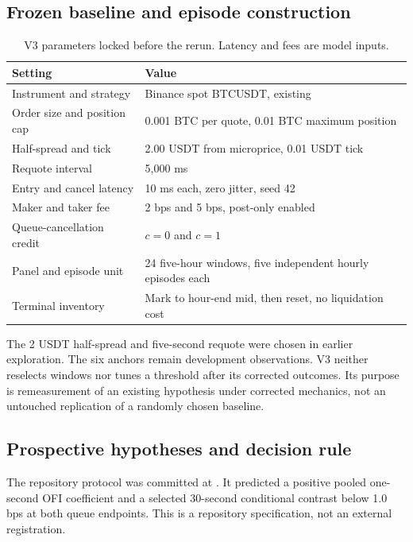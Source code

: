 \subsection{Frozen baseline and episode construction}

\begin{table}[H]
\centering
\caption{V3 parameters locked before the rerun. Latency and fees are model inputs.}
\begin{tabularx}{\textwidth}{@{}L{0.40\textwidth}Y@{}}
\toprule
Setting & Value \\
\midrule
Instrument and strategy & Binance spot BTCUSDT, existing  \\
Order size and position cap & 0.001 BTC per quote, 0.01 BTC maximum position \\
Half-spread and tick & 2.00 USDT from microprice, 0.01 USDT tick \\
Requote interval & 5,000 ms \\
Entry and cancel latency & 10 ms each, zero jitter, seed 42 \\
Maker and taker fee & 2 bps and 5 bps, post-only enabled \\
Queue-cancellation credit & $c=0$ and $c=1$ \\
Panel and episode unit & 24 five-hour windows, five independent hourly episodes each \\
Terminal inventory & Mark to hour-end mid, then reset, no liquidation cost \\
\bottomrule
\end{tabularx}
\end{table}

The 2 USDT half-spread and five-second requote were chosen in earlier
exploration. The six anchors remain development observations. V3 neither
reselects windows nor tunes a threshold after its corrected outcomes. Its
purpose is remeasurement of an existing hypothesis under corrected mechanics,
not an untouched replication of a randomly chosen baseline.

\subsection{Prospective hypotheses and decision rule}

The repository protocol  was committed at
\ProtocolCommit. It predicted a positive pooled one-second OFI coefficient
and a selected 30-second conditional contrast below 1.0 bps at both queue
endpoints. This is a repository specification, not an external registration.

